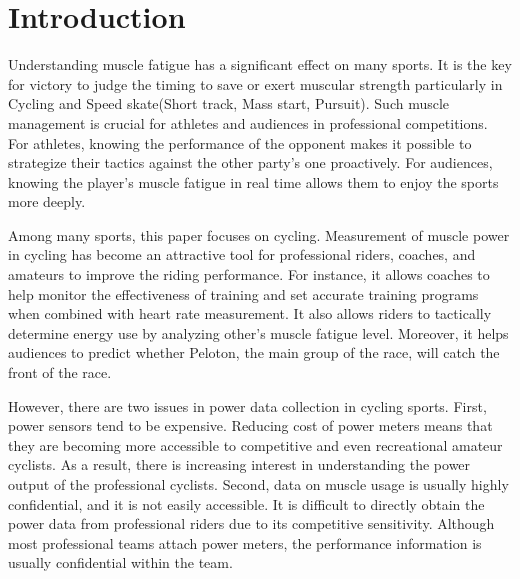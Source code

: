 \documentclass[runningheads]{llncs}
\begin{document}
\section{Introduction}

Understanding muscle fatigue has a significant effect on many sports. It is the key for victory to judge the timing to save or exert muscular strength particularly in Cycling and Speed skate(Short track, Mass start, Pursuit). Such muscle management is crucial for athletes and audiences in professional competitions. For athletes, knowing the performance of the opponent makes it possible to strategize their tactics against the other party's one proactively. For audiences, knowing the player's muscle fatigue in real time allows them to enjoy the sports more deeply.

Among many sports, this paper focuses on cycling. Measurement of muscle power in cycling has become an attractive tool for professional riders, coaches, and amateurs to improve the riding performance. For instance, it allows coaches to help monitor the effectiveness of training and set accurate training programs when combined with heart rate measurement. It also allows riders to tactically determine energy use by analyzing other's muscle fatigue level. Moreover, it helps audiences to predict whether Peloton, the main group of the race, will catch the front of the race.

However, there are two issues in power data collection in cycling sports. First, power sensors tend to be expensive. Reducing cost of power meters means that they are becoming more accessible to competitive and even recreational amateur cyclists. As a result, there is increasing interest in understanding the power output of the professional cyclists. Second, data on muscle usage is usually highly confidential, and it is not easily accessible. It is difficult to directly obtain the power data from professional riders due to its competitive sensitivity. Although most professional teams attach power meters, the performance information is usually confidential within the team.
\end{document}
